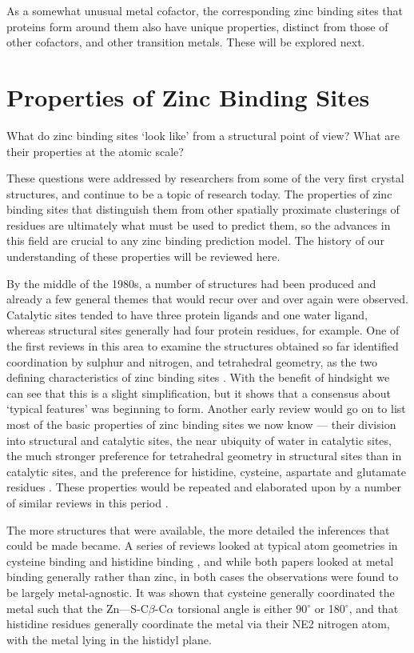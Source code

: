 As a somewhat unusual metal cofactor, the corresponding zinc binding sites that proteins form around them also have unique properties, distinct from those of other cofactors, and other transition metals. These will be explored next.

\section{Properties of Zinc Binding Sites}

What do zinc binding sites `look like' from a structural point of view? What are their properties at the atomic scale?

These questions were addressed by researchers from some of the very first crystal structures, and continue to be a topic of research today. The properties of zinc binding sites that distinguish them from other spatially proximate clusterings of residues are ultimately what must be used to predict them, so the advances in this field are crucial to any zinc binding prediction model. The history of our understanding of these properties will be reviewed here.

By the middle of the 1980s, a number of structures had been produced and already a few general themes that would recur over and over again were observed. Catalytic sites tended to have three protein ligands and one water ligand, whereas structural sites generally had four protein residues, for example. One of the first reviews in this area to examine the structures obtained so far identified coordination by sulphur and nitrogen, and tetrahedral geometry, as the two defining characteristics of zinc binding sites \cite{williams1987biochemistry}. With the benefit of hindsight we can see that this is a slight simplification, but it shows that a consensus about `typical features' was beginning to form. Another early review would go on to list most of the basic properties of zinc binding sites we now know --- their division into structural and catalytic sites, the near ubiquity of water in catalytic sites, the much stronger preference for tetrahedral geometry in structural sites than in catalytic sites, and the preference for histidine, cysteine, aspartate and glutamate residues \cite{vallee1990zinc}. These properties would be repeated and elaborated upon by a number of similar reviews in this period \cite{tainer1991metal,vallee1992functional,coleman1992zinc}.

The more structures that were available, the more detailed the inferences that could be made became. A series of reviews looked at typical atom geometries in cysteine binding \cite{chakrabarti1989geometry} and histidine binding \cite{chakrabarti1990geometry}, and while both papers looked at metal binding generally rather than zinc, in both cases the observations were found to be largely metal-agnostic. It was shown that cysteine generally coordinated the metal such that the Zn---S-C$\beta$-C$\alpha$ torsional angle is either 90$^\circ$ or 180$^\circ$, and that histidine residues generally coordinate the metal via their NE2 nitrogen atom, with the metal lying in the histidyl plane.

